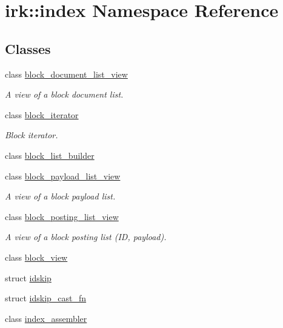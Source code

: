 \hypertarget{namespaceirk_1_1index}{}\section{irk\+:\+:index Namespace Reference}
\label{namespaceirk_1_1index}
\subsection*{Classes}
\begin{DoxyCompactItemize}
\item 
class \mbox{\hyperlink{classirk_1_1index_1_1block__document__list__view}{block\+\_\+document\+\_\+list\+\_\+view}}
\begin{DoxyCompactList}\small\item\em A view of a block document list. \end{DoxyCompactList}\item 
class \mbox{\hyperlink{classirk_1_1index_1_1block__iterator}{block\+\_\+iterator}}
\begin{DoxyCompactList}\small\item\em Block iterator. \end{DoxyCompactList}\item 
class \mbox{\hyperlink{classirk_1_1index_1_1block__list__builder}{block\+\_\+list\+\_\+builder}}
\item 
class \mbox{\hyperlink{classirk_1_1index_1_1block__payload__list__view}{block\+\_\+payload\+\_\+list\+\_\+view}}
\begin{DoxyCompactList}\small\item\em A view of a block payload list. \end{DoxyCompactList}\item 
class \mbox{\hyperlink{classirk_1_1index_1_1block__posting__list__view}{block\+\_\+posting\+\_\+list\+\_\+view}}
\begin{DoxyCompactList}\small\item\em A view of a block posting list (ID, payload). \end{DoxyCompactList}\item 
class \mbox{\hyperlink{classirk_1_1index_1_1block__view}{block\+\_\+view}}
\item 
struct \mbox{\hyperlink{structirk_1_1index_1_1idskip}{idskip}}
\item 
struct \mbox{\hyperlink{structirk_1_1index_1_1idskip__cast__fn}{idskip\+\_\+cast\+\_\+fn}}
\item 
class \mbox{\hyperlink{classirk_1_1index_1_1index__assembler}{index\+\_\+assembler}}

\end{DoxyCompactItemize}
